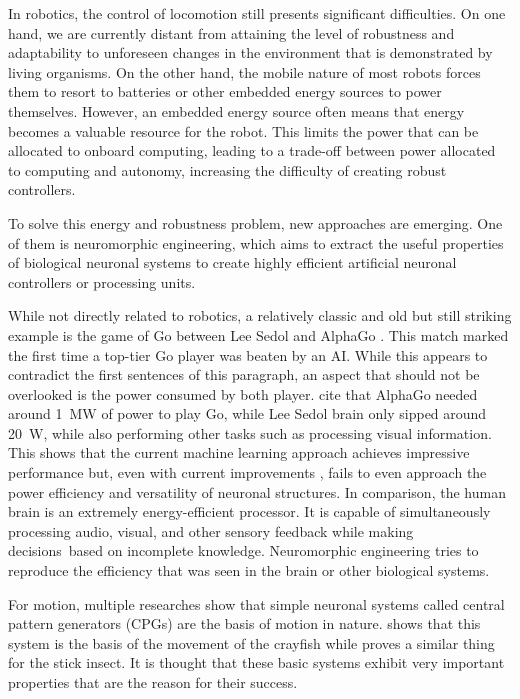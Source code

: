 In robotics, the control of locomotion still presents significant difficulties.
On one hand, we are currently distant from attaining the level of robustness and adaptability to unforeseen changes in the environment that is demonstrated by living organisms. 
On the other hand, the mobile nature of most robots forces them to resort to batteries or other embedded energy sources to power themselves. 
However, an embedded energy source often means that energy becomes a valuable resource for the robot. 
This limits the power that can be allocated to onboard computing, leading to a trade-off between power allocated to computing and autonomy, increasing the difficulty of creating robust controllers. 

To solve this energy and robustness problem, new approaches are emerging. 
One of them is neuromorphic engineering, which aims to extract the useful properties of biological neuronal systems to create highly efficient artificial neuronal controllers or processing units.

While not directly related to robotics, a relatively classic and old but still striking example is the game of Go between Lee Sedol and AlphaGo \citep{alphago1,alphago2,alphago3}. 
This match marked the first time a top-tier Go player was beaten by an AI. While this appears to contradict the first sentences of this paragraph, an aspect that should not be overlooked is the power consumed by both player. 
\citet{alphagoenergy} cite that AlphaGo needed around \qty{1}{\mega\watt} of power to play Go, while Lee Sedol brain only sipped around \qty{20}{\watt}, while also performing other tasks such as processing visual information. 
This shows that the current machine learning approach achieves impressive performance but, even with current improvements \citep{alphagolessenergy}, fails to even approach the power efficiency and versatility of neuronal structures.
In comparison, the human brain is an extremely energy-efficient processor. 
It is capable of simultaneously processing audio, visual, and other sensory feedback while making decisions based on incomplete knowledge. 
Neuromorphic engineering tries to reproduce the efficiency that was seen in the brain or other biological systems.

For motion, multiple researches \citep{crayfish,stickInsect,MARDER} show that simple neuronal systems called central pattern generators (CPGs) are the basis of motion in nature. 
\citet{crayfish} shows that this system is the basis of the movement of the crayfish while \citet{stickInsect} proves a similar thing for the stick insect.
It is thought that these basic systems exhibit very important properties that are the reason for their success.

